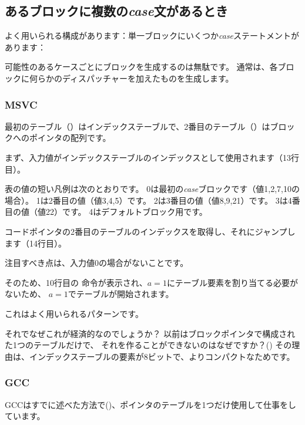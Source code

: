 ﻿\subsection{あるブロックに複数の\emph{case}文があるとき}

よく用いられる構成があります：単一ブロックにいくつか\emph{case}ステートメントがあります：



可能性のあるケースごとにブロックを生成するのは無駄です。
通常は、各ブロックに何らかのディスパッチャーを加えたものを生成します。

\subsubsection{MSVC}



最初のテーブル（）はインデックステーブルで、2番目のテーブル（）はブロックへのポインタの配列です。

まず、入力値がインデックステーブルのインデックスとして使用されます（13行目）。

表の値の短い凡例は次のとおりです。
0は最初の\emph{case}ブロックです（値1,2,7,10の場合）。
1は2番目の値（値3,4,5）です。
2は3番目の値（値8,9,21）です。
3は4番目の値（値22）です。
4はデフォルトブロック用です。

コードポインタの2番目のテーブルのインデックスを取得し、それにジャンプします（14行目）。

注目すべき点は、入力値0の場合がないことです。

そのため、10行目の \DEC 命令が表示され、$a=1$にテーブル要素を割り当てる必要がないため、
$a=1$でテーブルが開始されます。

これはよく用いられるパターンです。

それでなぜこれが経済的なのでしょうか？
以前はブロックポインタで構成された1つのテーブルだけで、
それを作ることができないのはなぜですか？()
その理由は、インデックステーブルの要素が8ビットで、よりコンパクトなためです。

\subsubsection{GCC}

GCCはすでに述べた方法で()、ポインタのテーブルを1つだけ使用して仕事をしています。

